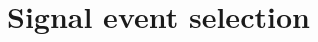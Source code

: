 % 




\section{Signal event selection}
\label{SECTION:ParkedDataAnalysis_SignalEventSelection}





